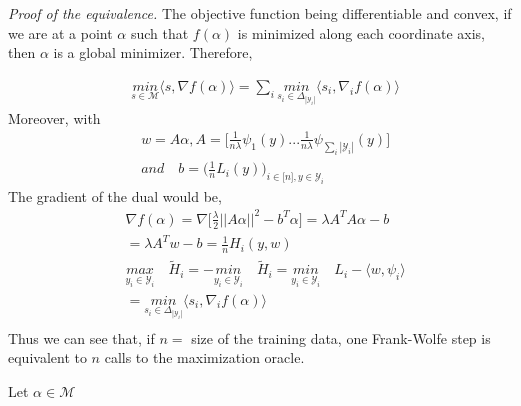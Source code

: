 \textit{Proof of the equivalence.} The objective function being differentiable
and convex, if we are at a point $\alpha$ such that $f(\alpha)$ is minimized
along each coordinate axis, then $\alpha$ is
a global minimizer. Therefore,

\begin{equation*}
\begin{aligned}
    &\underset{s\in\mathcal{M}}{\textit{min}}\langle s, \nabla f(\alpha)\rangle
= \sum_{i}\underset{s_{i}\in\Delta_{|\mathcal{Y}_{i}|}}{\textit{min}}\langle
s_{i}, \nabla_{i} f(\alpha)\rangle
\end{aligned}
\end{equation*}
Moreover, with
\begin{equation*}
\begin{aligned}
   &w=A\alpha, A=\Big[\frac{1}{n\lambda}\psi_{1}(y)...\frac{1}{n\lambda}\psi_{\sum_{i}|\mathcal{Y}_{i}|}(y)\Big]\\
   &\textit{and}\quad b=\Big(\frac{1}{n}L_{i}(y)\Big)_{i\in\big[n\big],y\in\mathcal{Y}_{i}}
\end{aligned}
\end{equation*}
The gradient of the dual would be,
\begin{equation*}
\begin{aligned}
    &\nabla f(\alpha)= \nabla\Big[\frac{\lambda}{2}||A\alpha||^{2}- b^{T}\alpha\Big] = \lambda A^{T}A\alpha- b\\
    &= \lambda A^{T}w- b= \frac{1}{n}H_{i}(y,w)\\
    &\underset{y_{i}\in\mathcal{Y}_{i}}{\textit{max}}\quad\tilde{H}_{i}=
  -\underset{y_{i}\in\mathcal{Y}_{i}}{\textit{min}}\quad\tilde{H}_{i} =
  \underset{y_{i}\in\mathcal{Y}_{i}}{\textit{min}}\quad L_{i}- \langle w,
  \psi_{i}\rangle\\ &=
  \underset{s_{i}\in\Delta_{|\mathcal{Y}_{i}|}}{\textit{min}}\langle s_{i},
  \nabla_{i} f(\alpha)\rangle\\
\end{aligned}
\end{equation*}
Thus we can see that, if $n=$ size of the training data, one Frank-Wolfe step is equivalent to $n$ calls to the maximization oracle.
\begin{algorithmic}
   \STATE Let $\alpha\in\mathcal{M}$
    \\
   \ENDFOR
   \ENDFOR
\end{algorithmic}

